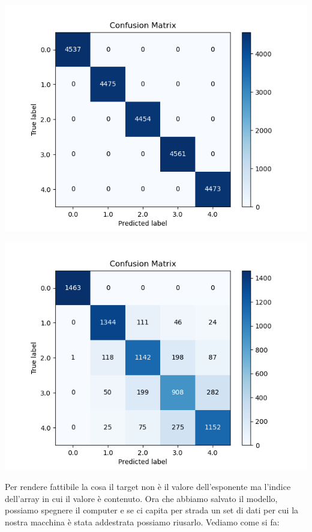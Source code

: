 \documentclass[10pt,a4paper]{article}
\begin{document}
\begin{multicols}{2}


\includegraphics[scale=0.5]{img/pred_know_data.png}


\includegraphics[scale=0.5]{img/pred_data.png}


\end{multicols}
Per rendere fattibile la cosa il target non è il valore dell'esponente ma l'indice dell'array in cui il valore è contenuto. Ora che abbiamo salvato il modello, possiamo spegnere il computer e se ci capita per strada un set di dati per cui la nostra macchina è stata addestrata possiamo riusarlo. Vediamo come si fa:
\end{document}
